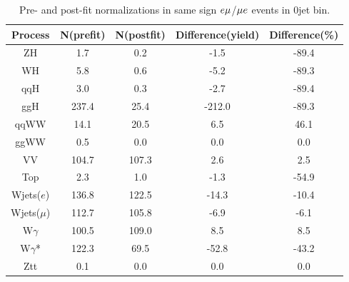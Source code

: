 \begin{table}
\begin{center}
\begin{tabular}{c|cc|cc}
\hline
\hline
Process &    N(prefit) &   N(postfit) & Difference(yield) &  Difference(\%)  \\  
\hline
\hline
ZH &        1.7 &        0.2 &       -1.5 &      -89.4        \\
WH &        5.8 &        0.6 &       -5.2 &      -89.3        \\
qqH &        3.0 &        0.3 &       -2.7 &      -89.4        \\
ggH &      237.4 &       25.4 &     -212.0 &      -89.3        \\
\hline
qqWW &       14.1 &       20.5 &        6.5 &       46.1        \\
ggWW &        0.5 &        0.0 &        0.0 &        0.0        \\
\hline
VV &      104.7 &      107.3 &        2.6 &        2.5        \\
\hline
Top &        2.3 &        1.0 &       -1.3 &      -54.9        \\
\hline
Wjets($e$) &      136.8 &      122.5 &      -14.3 &      -10.4        \\
Wjets($\mu$) &      112.7 &      105.8 &       -6.9 &       -6.1        \\
\hline
W$\gamma$ &      100.5 &      109.0 &        8.5 &        8.5        \\
W$\gamma$* &      122.3 &       69.5 &      -52.8 &      -43.2        \\
\hline
Ztt &        0.1 &        0.0 &        0.0 &        0.0        \\
\hline
\hline
\end{tabular}
\caption{Pre- and post-fit normalizations in same sign $e\mu$/$\mu e$ events in 0jet bin. }
\label{tab:fitval_norm_ss_0j}
\end{center}
\end{table}

